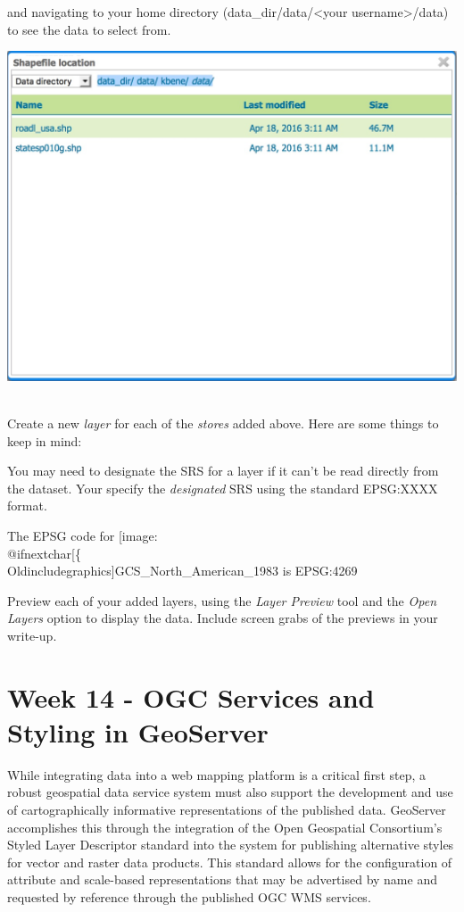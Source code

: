 \documentclass[]{book}
\makeatletter
\providecommand{\tightlist}{%
  \setlength{\itemsep}{0pt}\setlength{\parskip}{0pt}}
\def\ScaleIfNeeded{%
  \ifdim\Gin@nat@width>.5\linewidth
    .5\linewidth
  \else
    \Gin@nat@width
  \fi
}
\let\Oldincludegraphics\texttt{[image: \%
 \\catcode`\\@=11\\relax\%
 \%\\gdef\\includegraphics\{\\@ifnextchar[\{\\Oldincludegraphics]}{\Oldincludegraphics[width=\ScaleIfNeeded]}}%
\gdef\texttt{[image: \\@ifnextchar[\{\\Oldincludegraphics]}{\Oldincludegraphics[max size={.75\textwidth}{.75\textheight}]}}%
\makeatother
\begin{document}
and navigating to your home directory (data\_dir/data/\textless{}your
username\textgreater{}/data) to see the data to select from.

\includegraphics{images/GeoServer_SelectData.jpg}~

Create a new \emph{layer} for each of the \emph{stores} added above.
Here are some things to keep in mind:

You may need to designate the SRS for a layer if it can't be read
directly from the dataset. Your specify the \emph{designated} SRS using
the standard EPSG:XXXX format.

The EPSG code for \texttt{GCS\_North\_American\_1983} is EPSG:4269

\begin{description}
\tightlist
\item[Question 3]
Preview each of your added layers, using the \emph{Layer Preview} tool
and the \emph{Open Layers} option to display the data. Include screen
grabs of the previews in your write-up.
\end{description}

\chapter{Week 14 - OGC Services and Styling in GeoServer}\label{week14}

While integrating data into a web mapping platform is a critical first
step, a robust geospatial data service system must also support the
development and use of cartographically informative representations of
the published data. GeoServer accomplishes this through the integration
of the Open Geospatial Consortium's Styled Layer Descriptor standard
into the system for publishing alternative styles for vector and raster
data products. This standard allows for the configuration of attribute
and scale-based representations that may be advertised by name and
requested by reference through the published OGC WMS services.
\end{document}
